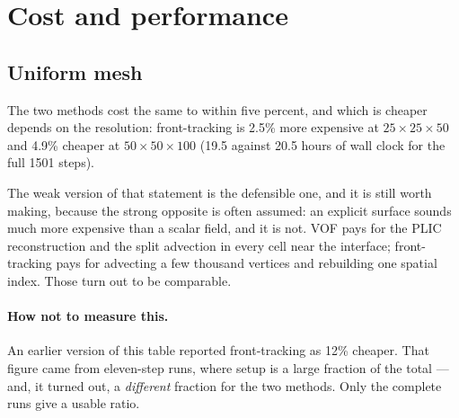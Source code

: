 \section{Cost and performance}
\label{sec:cost}


\subsection{Uniform mesh}

\begin{table}[htbp]
\centering
\caption{Measured cost in microseconds per cell-step, single core, uniform mesh.
Same mesh and same conditions for both methods.}
\label{tab:cost}
\small
{}
\end{table}

The two methods cost the same to within five percent, and which is cheaper
depends on the resolution: front-tracking is 2.5\% more expensive at
$25\times25\times50$ and 4.9\% cheaper at $50\times50\times100$ (19.5 against
20.5 hours of wall clock for the full 1501 steps).

The weak version of that statement is the defensible one, and it is still worth
making, because the strong opposite is often assumed: an explicit surface sounds
much more expensive than a scalar field, and it is not. VOF pays for the PLIC
reconstruction and the split advection in every cell near the interface;
front-tracking pays for advecting a few thousand vertices and rebuilding one
spatial index. Those turn out to be comparable.

\paragraph{How not to measure this.}
An earlier version of this table reported front-tracking as 12\% cheaper. That
figure came from eleven-step runs, where setup is a large fraction of the total
--- and, it turned out, a \emph{different} fraction for the two methods. Only
the complete runs give a usable ratio.

